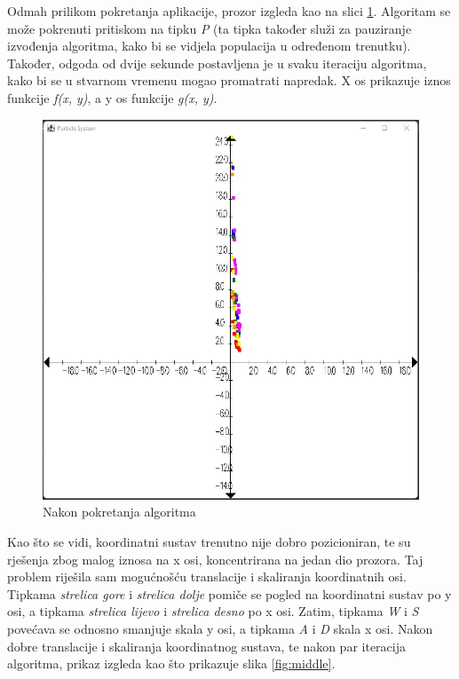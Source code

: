 \documentclass[]{article}
\begin{document}
Odmah prilikom pokretanja aplikacije, prozor izgleda kao na slici \ref{fig:before}. Algoritam se može pokrenuti pritiskom na tipku \textit{P} (ta tipka također služi za pauziranje izvođenja algoritma, kako bi se vidjela populacija u određenom trenutku). Također, odgoda od dvije sekunde postavljena je u svaku iteraciju algoritma, kako bi se u stvarnom vremenu mogao promatrati napredak. X os prikazuje iznos funkcije \textit{f(x, y)}, a y os funkcije \textit{g(x, y)}.\\
\begin{figure}[h]
	\includegraphics[scale=0.5]{before.jpg}
	\centering
	\caption{Nakon pokretanja algoritma}
	\label{fig:before}
\end{figure}

Kao što se vidi, koordinatni sustav trenutno nije dobro pozicioniran, te su rješenja zbog malog iznosa na x osi, koncentrirana na jedan dio prozora. Taj problem riješila sam mogućnošću translacije i skaliranja koordinatnih osi. Tipkama \textit{strelica gore} i \textit{strelica dolje} pomiče se pogled na koordinatni sustav po y osi, a tipkama \textit{strelica lijevo} i \textit{strelica desno} po x osi. Zatim, tipkama \textit{W} i \textit{S} povećava se odnosno smanjuje skala y osi, a tipkama \textit{A} i \textit{D} skala x osi. Nakon dobre translacije i skaliranja koordinatnog sustava, te nakon par iteracija algoritma, prikaz izgleda kao što prikazuje slika \ref{fig:middle}.
\pagebreak
\end{document}
